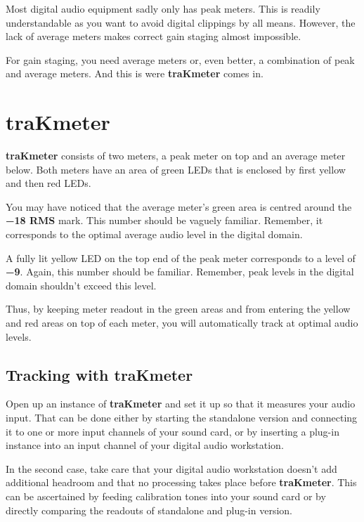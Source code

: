 Most digital audio equipment sadly only has peak meters.  This is
readily understandable as you want to avoid digital clippings by all
means.  However, the lack of average meters makes correct gain staging
almost impossible.

For gain staging, you need average meters or, even better, a
combination of peak and average meters.  And this is were
\textbf{traKmeter} comes in.

\chapter{traKmeter}
\label{chap:trakmeter}

\textbf{traKmeter} consists of two meters, a peak meter on top and an
average meter below.  Both meters have an area of green LEDs that is
enclosed by first yellow and then red LEDs.

You may have noticed that the average meter's green area is centred
around the \textbf{\SI{-18}{\dBFS} RMS} mark.  This number should be
vaguely familiar.  Remember, it corresponds to the optimal average
audio level in the digital domain.

A fully lit yellow LED on the top end of the peak meter corresponds to
a level of \textbf{\SI{-9}{\dBFS}}.  Again, this number should be
familiar.  Remember, peak levels in the digital domain shouldn't
exceed this level.

Thus, by keeping meter readout in the green areas and from entering
the yellow and red areas on top of each meter, you will automatically
track at optimal audio levels.

\section{Tracking with traKmeter}
\label{sec:tracking_with_trakmeter}

Open up an instance of \textbf{traKmeter} and set it up so that it
measures your audio input.  That can be done either by starting the
standalone version and connecting it to one or more input channels of
your sound card, or by inserting a plug-in instance into an input
channel of your digital audio workstation.

In the second case, take care that your digital audio workstation
doesn't add additional headroom and that no processing takes place
before \textbf{traKmeter}.  This can be ascertained by feeding
calibration tones into your sound card or by directly comparing the
readouts of standalone and plug-in version.

